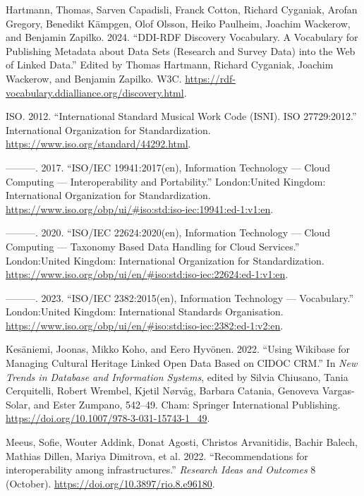 \documentclass[
  letterpaper,
  DIV=11,
  numbers=noendperiod]{scrreprt}
\newlength{\cslhangindent}
\newenvironment{CSLReferences}[2] %
 {\begin{list}{}{%
  \setlength{\itemindent}{0pt}
  \setlength{\leftmargin}{0pt}
  \setlength{\parsep}{0pt}
  \ifodd #1
   \setlength{\leftmargin}{\cslhangindent}
   \setlength{\itemindent}{-1\cslhangindent}
  \fi
  \setlength{\itemsep}{#2\baselineskip}}}
 {\end{list}}
\begin{document}
\begin{CSLReferences}{1}{0}
Hartmann, Thomas, Sarven Capadisli, Franck Cotton, Richard Cyganiak,
Arofan Gregory, Benedikt Kämpgen, Olof Olsson, Heiko Paulheim, Joachim
Wackerow, and Benjamin Zapilko. 2024. {``{DDI}-{RDF} Discovery
Vocabulary. A Vocabulary for Publishing Metadata about Data Sets
(Research and Survey Data) into the Web of Linked Data.''} Edited by
Thomas Hartmann, Richard Cyganiak, Joachim Wackerow, and Benjamin
Zapilko. W3C.
\url{https://rdf-vocabulary.ddialliance.org/discovery.html}.

ISO. 2012. {``International Standard Musical Work Code ({ISNI}). {ISO}
27729:2012.''} International Organization for Standardization.
\url{https://www.iso.org/standard/44292.html}.

---------. 2017. {``{ISO}/{IEC} 19941:2017(en), Information Technology
--- Cloud Computing --- Interoperability and Portability.''}
London:United Kingdom: International Organization for Standardization.
\url{https://www.iso.org/obp/ui/\#iso:std:iso-iec:19941:ed-1:v1:en}.

---------. 2020. {``{ISO}/{IEC} 22624:2020(en), Information Technology
--- Cloud Computing --- Taxonomy Based Data Handling for Cloud
Services.''} London:United Kingdom: {International Organization for
Standardization}.
\url{https://www.iso.org/obp/ui/en/\#iso:std:iso-iec:22624:ed-1:v1:en}.

---------. 2023. {``{ISO}/{IEC} 2382:2015(en), Information Technology
--- Vocabulary.''} London:United Kingdom: International Standards
Organisation.
\url{https://www.iso.org/obp/ui/en/\#iso:std:iso-iec:2382:ed-1:v2:en}.

Kesäniemi, Joonas, Mikko Koho, and Eero Hyvönen. 2022. {``Using Wikibase
for Managing Cultural Heritage Linked Open Data Based on {CIDOC}
{CRM}.''} In \emph{New Trends in Database and Information Systems},
edited by Silvia Chiusano, Tania Cerquitelli, Robert Wrembel, Kjetil
Nørvåg, Barbara Catania, Genoveva Vargas-Solar, and Ester Zumpano,
542--49. Cham: Springer International Publishing.
\url{https://doi.org/10.1007/978-3-031-15743-1_49}.

Meeus, Sofie, Wouter Addink, Donat Agosti, Christos Arvanitidis, Bachir
Balech, Mathias Dillen, Mariya Dimitrova, et al. 2022.
{``{Recommendations for interoperability among infrastructures}.''}
\emph{Research Ideas and Outcomes} 8 (October).
\url{https://doi.org/10.3897/rio.8.e96180}.


\end{CSLReferences}
\end{document}
